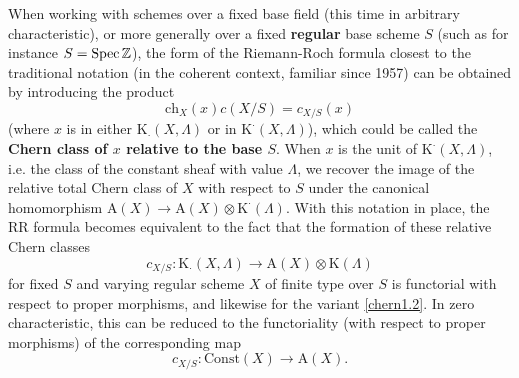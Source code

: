 When working with schemes over a fixed base field (this time in arbitrary characteristic), or more generally over a fixed \textbf{regular} base scheme $S$ (such as for instance $S = \operatorname{Spec} \mathbb{Z}$), the form of the Riemann-Roch formula closest to the traditional notation (in the coherent context, familiar since 1957) can be obtained by introducing the product
\begin{equation}\label{relchern} 
\text{ch}_X(x)c(X/S) = c_{X/S}(x)
\end{equation}
(where $x$ is in either $\text{K}_\cdot(X, \Lambda)$ or in $\text{K}^\cdot(X, \Lambda)$), which could be called the \textbf{Chern class of $x$ relative to the base $S$}. When $x$ is the unit of $\text{K}^\cdot(X, \Lambda)$, i.e. the class of the constant sheaf with value $\Lambda$, we recover the image of the relative total Chern class of $X$ with respect to $S$ under the canonical homomorphism $\text{A}(X) \to \text{A}(X) \otimes \text{K}^\cdot(\Lambda)$. With this notation in place, the RR formula becomes equivalent to the fact that the formation of these relative Chern classes
\begin{equation}\label{chern3.1}
 c_{X/S}: \text{K}_\cdot(X, \Lambda) \to \text{A}(X) \otimes \text{K}(\Lambda) 
 \end{equation}
for fixed $S$ and varying regular scheme $X$ of finite type over $S$ is functorial with respect to proper morphisms, and likewise for the variant \ref{chern1.2}. In zero characteristic, this can be reduced to the functoriality (with respect to proper morphisms) of the corresponding map
\begin{equation}\label{abschern} 
c_{X/S}: \text{Const}(X) \to \text{A}(X). 
\end{equation}

